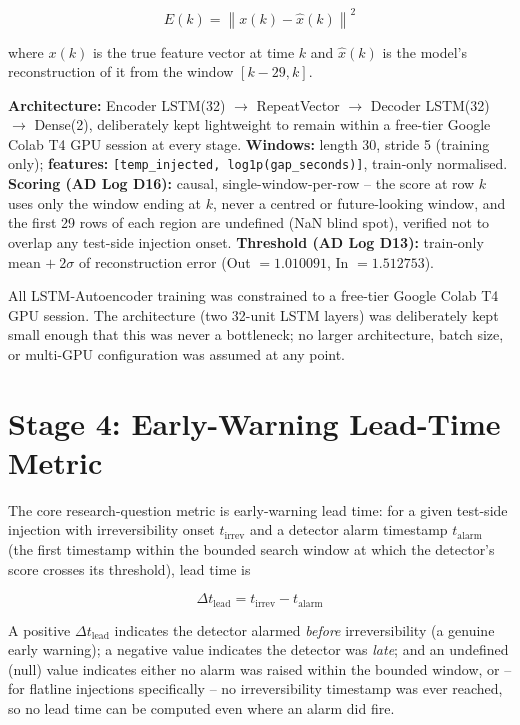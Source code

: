 \documentclass[11pt,a4paper,oneside]{report}
\begin{document}
\begin{equation}
E(k) = \left\| x(k) - \hat{x}(k) \right\|^2
\label{eq:lstm_score}
\end{equation}

where $x(k)$ is the true feature vector at time $k$ and $\hat{x}(k)$ is the model's reconstruction of it from the window $[k-29, k]$.

\textbf{Architecture:} Encoder LSTM(32) $\rightarrow$ RepeatVector $\rightarrow$ Decoder LSTM(32) $\rightarrow$ Dense(2), deliberately kept lightweight to remain within a free-tier Google Colab T4 GPU session at every stage. \textbf{Windows:} length 30, stride 5 (training only); \textbf{features:} \texttt{[temp\_injected, log1p(gap\_seconds)]}, train-only normalised. \textbf{Scoring (AD Log D16):} causal, single-window-per-row -- the score at row $k$ uses only the window ending at $k$, never a centred or future-looking window, and the first 29 rows of each region are undefined (NaN blind spot), verified not to overlap any test-side injection onset. \textbf{Threshold (AD Log D13):} train-only mean $+\ 2\sigma$ of reconstruction error (Out $=1.010091$, In $=1.512753$).

\begin{limitationbox}
All LSTM-Autoencoder training was constrained to a free-tier Google Colab T4 GPU session. The architecture (two 32-unit LSTM layers) was deliberately kept small enough that this was never a bottleneck; no larger architecture, batch size, or multi-GPU configuration was assumed at any point.
\end{limitationbox}

\section{Stage 4: Early-Warning Lead-Time Metric}
\label{sec:lead_time_metric}

The core research-question metric is early-warning lead time: for a given test-side injection with irreversibility onset $t_{\text{irrev}}$ and a detector alarm timestamp $t_{\text{alarm}}$ (the first timestamp within the bounded search window at which the detector's score crosses its threshold), lead time is

\begin{equation}
\Delta t_{\text{lead}} = t_{\text{irrev}} - t_{\text{alarm}}
\label{eq:lead_time}
\end{equation}

A positive $\Delta t_{\text{lead}}$ indicates the detector alarmed \emph{before} irreversibility (a genuine early warning); a negative value indicates the detector was \emph{late}; and an undefined (null) value indicates either no alarm was raised within the bounded window, or -- for flatline injections specifically -- no irreversibility timestamp was ever reached, so no lead time can be computed even where an alarm did fire.
\end{document}
